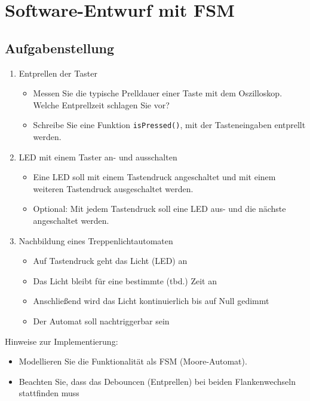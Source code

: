 \section{Software-Entwurf mit FSM}
\subsection{Aufgabenstellung}
\begin{enumerate}%
		\item Entprellen der Taster
		\begin{itemize}
			\item Messen Sie die typische Prelldauer einer Taste mit dem Oszilloskop. Welche Entprellzeit schlagen Sie vor?
			\item Schreibe Sie eine Funktion \texttt{isPressed()}, mit der Tasteneingaben entprellt werden. 
		\end{itemize}
		\item LED mit einem Taster an- und ausschalten
		\begin{itemize}
			\item Eine LED soll mit einem Tastendruck angeschaltet und mit einem weiteren Tastendruck ausgeschaltet werden.
			\item Optional: Mit jedem Tastendruck soll eine LED aus- und die nächste angeschaltet werden.
		\end{itemize}
		\item Nachbildung eines Treppenlichtautomaten
		\begin{itemize}
			\item Auf Tastendruck geht das Licht (LED) an
			\item Das Licht bleibt für eine bestimmte (tbd.) Zeit an
			\item Anschließend wird das Licht kontinuierlich bis auf Null gedimmt
			\item Der Automat soll nachtriggerbar sein
		\end{itemize}
\end{enumerate}
Hinweise zur Implementierung:
\begin{itemize}
	\item Modellieren Sie die Funktionalität als FSM (Moore-Automat).
	\item Beachten Sie, dass das Debouncen (Entprellen) bei beiden Flankenwechseln stattfinden muss
\end{itemize}

